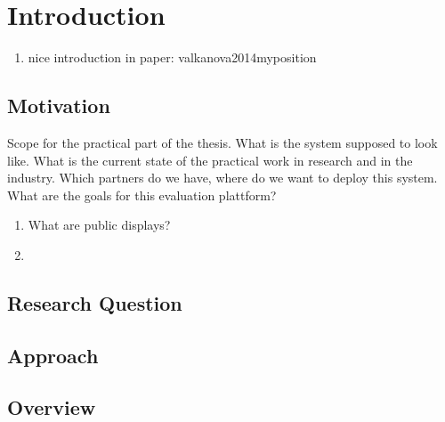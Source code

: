 \section{Introduction}



\begin{enumerate}
\item nice introduction in paper: valkanova2014myposition
\end{enumerate}



\subsection{Motivation}

Scope for the practical part of the thesis. What is the system supposed to look like. What is the current state of the practical work in research and in the industry. Which partners do we have, where do we want to deploy this system. What are the goals for this evaluation plattform?


  \begin{enumerate}
  \item What are public displays?
  \item 
  \end{enumerate}


\subsection{Research Question}



\subsection{Approach}



\subsection{Overview}











